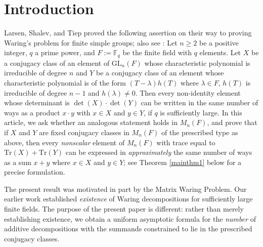 \documentclass[preprint,11pt]{amsart}
\def\F{\mathbb{F}}
\theoremstyle{definition}
\numberwithin{thm}{section}
\newcommand{\tit}[1]{\textit{#1}}
\def\F{\mathbb{F}}
\newcommand{\tr}{\textrm{Tr}}
\newcommand{\GL}{\textrm{GL}}
\begin{document}

\maketitle


\section{Introduction}\label{intro}


Larsen, Shalev, and Tiep \cite{LST}   proved the following assertion on their way to proving Waring's problem for finite simple groups; also see \cite{Sh}: 
Let $n \geq 2$ be a positive integer, $q$ a prime power, and $F := \F_q$ be the finite field with $q$ elements. Let $X$ be a conjugacy class of an element of $\GL_n(F)$ whose characteristic polynomial is irreducible of degree $n$ and $Y$ be a conjugacy class of an element whose characteristic polynomial is of the form $(T- \lambda) h(T)$ where $\lambda \in F$,  $h(T)$ is irreducible of degree $n-1$ and $h(\lambda) \neq 0$. Then every non-identity element whose determinant is $\det(X) \cdot \det(Y)$ can be written in the same number of ways as a product $x \cdot y$ with $x \in X$ and $y \in Y$, if $q$ is sufficiently large. In this article, we ask whether  an analogous statement holds in $M_n(F)$, and prove that if $X$ and $Y$ are fixed conjugacy classes in $M_n(F)$ of the prescribed type as above, then every \tit{nonscalar} element of $M_n(F)$ with  trace equal to $\tr(X) + \tr(Y)$ can be expressed in \textit{approximately} the same number of ways as a sum $x + y$ where $x \in X$ and $y \in Y$; see Theorem \ref{mainthm1} below for a precise formulation.


The present result was motivated in part by the Matrix Waring Problem. Our earlier work \cite{Ki, KS, KVZ} established \tit{existence} of Waring decompositions for sufficiently large finite fields. The purpose of the present paper is different: rather than merely establishing existence, we obtain a uniform asymptotic formula for the \textit{number} of additive decompositions with the summands constrained to lie in the prescribed conjugacy classes.
\end{document}
